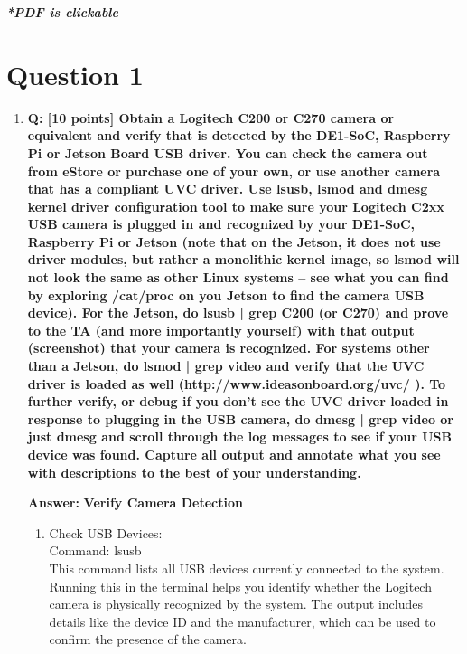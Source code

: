 \documentclass[a4paper,11pt]{article}%
\newenvironment{qanda}{\setlength{\parindent}{0pt}}{\bigskip}
\newcommand{\Q}{\bigskip\bfseries Q: }
\newcommand{\A}{\par\textbf{Answer: } \normalfont}
\begin{document}



\pagebreak

\tableofcontents
\listoffigures
\listoftables
\vfill
\begin{center}
	\textbf{\textit{*PDF is clickable}}
\end{center}



\pagebreak
\begin{qanda}
	\section{Question 1}
	\begin{enumerate}
		\item[] \Q [10 points] Obtain a Logitech C200 or C270 camera or equivalent and
			verify that is detected by the DE1-SoC, Raspberry Pi or Jetson Board USB driver. You can check
			the camera out from eStore or purchase one of your own, or use another camera that has a compliant
			UVC driver. Use lsusb, lsmod and dmesg kernel driver configuration tool to make sure your
			Logitech C2xx USB camera is plugged in and recognized by your DE1-SoC, Raspberry Pi or Jetson
			(note that on the Jetson, it does not use driver modules, but rather a monolithic kernel image, so
			lsmod will not look the same as other Linux systems – see what you can find by exploring /cat/proc
			on you Jetson to find the camera USB device). For the Jetson, do lsusb | grep C200 (or C270) and
			prove to the TA (and more importantly yourself) with that output (screenshot) that your camera is
			recognized. For systems other than a Jetson, do lsmod | grep video and verify that the UVC driver is
			loaded as well (http://www.ideasonboard.org/uvc/ ). To further verify, or debug if you don’t see the
			UVC driver loaded in response to plugging in the USB camera, do dmesg | grep video or just dmesg
			and scroll through the log messages to see if your USB device was found. Capture all output and
			annotate what you see with descriptions to the best of your understanding.
			\A
			\textbf{Verify Camera Detection}
			\begin{enumerate}
				\item Check USB Devices:\\

				      Command: lsusb\\
				      This command lists all USB devices currently connected to the system. Running this in the terminal helps you identify whether the Logitech camera is physically recognized by the system. The output includes details like the device ID and the manufacturer, which can be used to confirm the presence of the camera.\\


\end{enumerate}
\end{enumerate}
\end{qanda}
\end{document}
